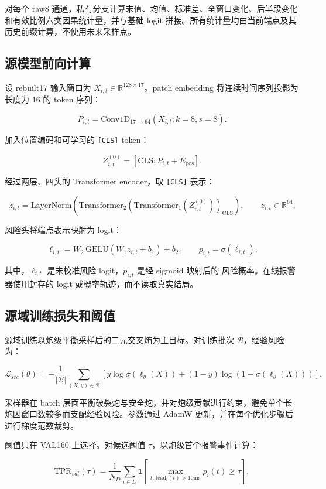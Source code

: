 \documentclass[11pt,a4paper]{article}
\newcommand{\code}[1]{\texttt{\small #1}}
\begin{document}
对每个 raw8 通道，私有分支计算末值、均值、标准差、全窗口变化、后半段变化
和有效比例六类因果统计量，并与基础 logit 拼接。所有统计量均由当前端点及其
历史前缀计算，不使用未来采样点。

\subsection{源模型前向计算}

设 rebuilt17 输入窗口为 \(X_{i,t}\in\mathbb{R}^{128\times17}\)。patch
embedding 将连续时间序列投影为长度为 16 的 token 序列：

\[
P_{i,t}=\mathrm{Conv1D}_{17\rightarrow64}(X_{i,t};k=8,s=8).
\]

加入位置编码和可学习的 \code{[CLS]} token：

\[
Z_{i,t}^{(0)}=[\mathrm{CLS};P_{i,t}+E_{\mathrm{pos}}].
\]

经过两层、四头的 Transformer encoder，取 \code{[CLS]} 表示：

\[
z_{i,t}=\mathrm{LayerNorm}\left(
\mathrm{Transformer}_2(
\mathrm{Transformer}_1(Z_{i,t}^{(0)}))_{\mathrm{CLS}}\right),
\qquad z_{i,t}\in\mathbb{R}^{64}.
\]

风险头将端点表示映射为 logit：

\[
\ell_{i,t}=W_2\,\mathrm{GELU}(W_1z_{i,t}+b_1)+b_2,
\qquad p_{i,t}=\sigma(\ell_{i,t}).
\]

其中，\(\ell_{i,t}\) 是未校准风险 logit，\(p_{i,t}\) 是经 sigmoid 映射后的
风险概率。在线报警器使用封存的 logit 或概率轨迹，而不读取真实结局。

\subsection{源域训练损失和阈值}

源域训练以炮级平衡采样后的二元交叉熵为主目标。对训练批次
\(\mathcal{B}\)，经验风险为：

\[
\mathcal{L}_{src}(\theta)
=-\frac{1}{|\mathcal{B}|}\sum_{(X,y)\in\mathcal{B}}
\left[y\log\sigma(\ell_\theta(X))
+(1-y)\log\left(1-\sigma(\ell_\theta(X))\right)\right].
\]

采样器在 batch 层面平衡破裂炮与安全炮，并对炮级贡献进行约束，避免单个长
炮因窗口数较多而支配经验风险。参数通过 AdamW 更新，并在每个优化步骤后
进行梯度范数裁剪。

阈值只在 VAL160 上选择。对候选阈值 \(\tau\)，以炮级首个报警事件计算：

\[
\mathrm{TPR}_{val}(\tau)
=
\frac{1}{N_D}\sum_{i\in D}
\mathbf{1}\left[
\max_{t:\,\mathrm{lead}_i(t)>10\mathrm{ms}}p_i(t)\ge\tau
\right],
\]
\end{document}
